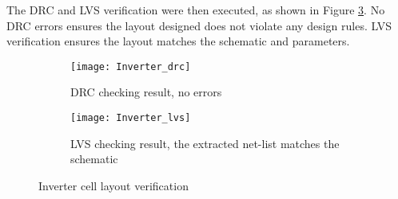 The DRC and LVS verification were then executed, as shown in Figure \ref{fig:inv_vfy}. No DRC errors ensures the layout designed does not violate any design rules. LVS verification ensures the layout matches the schematic and parameters.

\begin{figure}[!htb]
	\centering
	\begin{subfigure}[b]{0.5\textwidth}
		\texttt{[image: Inverter\_drc]}
		\caption{DRC checking result, no errors}
		\label{fig:inv_drc}
	\end{subfigure}
	\begin{subfigure}[b]{0.4\textwidth}
		\texttt{[image: Inverter\_lvs]}
		\caption{LVS checking result, the extracted net-list matches the schematic}
		\label{fig:inv_lvs}
	\end{subfigure}
	\caption{Inverter cell layout verification}
	\label{fig:inv_vfy}
\end{figure}
